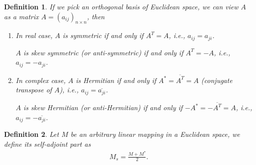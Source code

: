 \documentclass[11pt]{book}
\newtheorem{definition}{Definition}[chapter]
\theoremstyle{definition}
\numberwithin{equation}{chapter}
\begin{document}
\begin{definition}
If we pick an orthogonal basis of Euclidean space, we can view $A$ as a matrix $A = (a_{ij})_{n\times n}$, then 
\begin{enumerate}[label=(\arabic*)]
    \item In real case, $A$ is symmetric if and only if $A^T = A$, i.e., $a_{ij} = a_{ji}$.
    
    $A$ is skew symmetric (or anti-symmetric) if and only if $A^T = -A$, i.e., $a_{ij} = -a_{ji}$.
    
    \item In complex case, $A$ is Hermitian if and only if $A^* = \overline{A^T} = A$ (conjugate transpose of $A$), i.e., $a_{ij} = \overline{a_{ji}}$.
    
    $A$ is skew Hermitian (or anti-Hermitian) if and only if $- A^* = - \overline{A^T} = A$, i.e., $a_{ij} = - \overline{a_{ji}}$.
\end{enumerate}
\end{definition}

\medskip

\begin{definition}
Let $M$ be an arbitrary linear mapping in a Euclidean space, we define its self-adjoint part as 
\begin{align*}
    M_s = \frac{M + M^*}{2}.
\end{align*}
\end{definition}

\medskip
\end{document}
